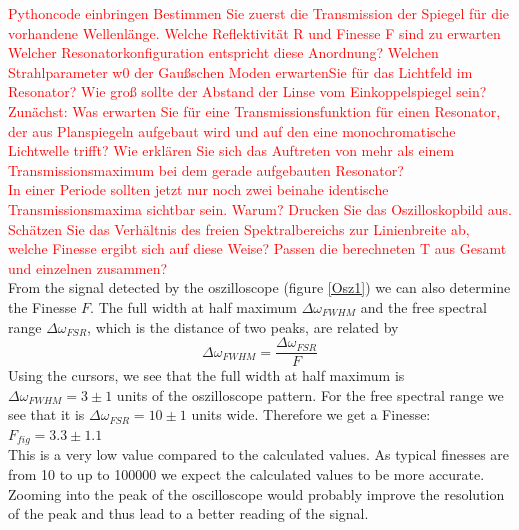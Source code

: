 \documentclass{article}
\begin{document}
\textcolor{red}{
Pythoncode einbringen
Bestimmen Sie zuerst die Transmission der Spiegel für die vorhandene Wellenlänge. Welche
Reflektivität R und Finesse F sind zu erwarten
Welcher Resonatorkonfiguration entspricht diese Anordnung? Welchen Strahlparameter w0 der Gaußschen Moden erwartenSie für das Lichtfeld im Resonator? Wie groß sollte der Abstand der Linse vom Einkoppelspiegel sein?
Zunächst: Was erwarten Sie für eine Transmissionsfunktion für einen Resonator, der aus Planspiegeln aufgebaut wird und auf den eine monochromatische Lichtwelle trifft? Wie erklären Sie sich das Auftreten von mehr als einem Transmissionsmaximum bei dem gerade aufgebauten Resonator? \\
In einer Periode sollten jetzt nur noch zwei beinahe identische Transmissionsmaxima sichtbar sein. Warum? Drucken Sie das Oszilloskopbild aus. Schätzen Sie das Verhältnis des freien Spektralbereichs zur Linienbreite ab, welche Finesse ergibt sich auf diese Weise? Passen die berechneten T aus Gesamt und einzelnen zusammen?}\\

From the signal detected by the oszilloscope (figure \ref{Osz1}) we can also determine the Finesse $F$. The full width at half maximum $\Delta\omega_{FWHM}$ and the free spectral range $\Delta\omega_{FSR}$, which is the distance of two peaks, are related by 
\begin{equation}
\Delta\omega_{FWHM} = \frac{\Delta\omega_{FSR}}{F}
\label{FinesseOszilloskopbild}
\end{equation}
Using the cursors, we see that the full width at half maximum is $\Delta\omega_{FWHM} =3 \pm 1$ units of the oszilloscope pattern. For the free spectral range we see that it is $\Delta\omega_{FSR} = 10 \pm 1$ units wide. Therefore we get a Finesse:\\
$F_{fig} = 3.3 \pm 1.1$\\
This is a very low value compared to the calculated values. As typical finesses are from 10 to up to 100000 \cite{optres} we expect the calculated values to be more accurate. Zooming into the peak of the oscilloscope would probably improve the resolution of the peak and thus lead to a better reading of the signal.\\
\end{document}
